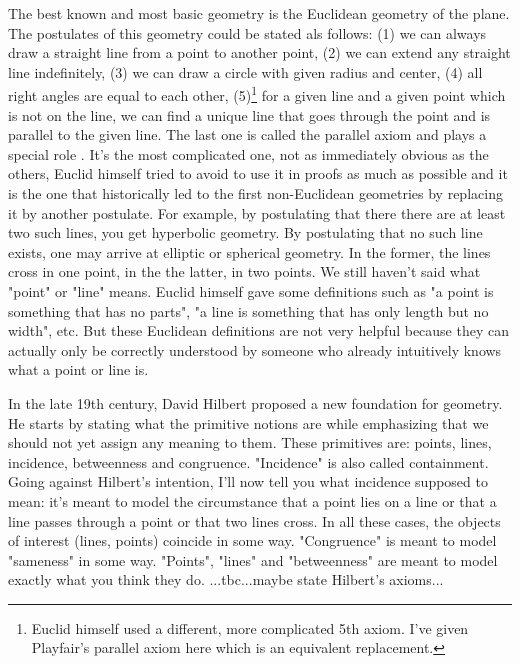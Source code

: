 \medskip
The best known and most basic geometry is the Euclidean geometry of the plane. The postulates of this geometry could be stated als follows: (1) we can always draw a straight line from a point to another point, (2) we can extend any straight line indefinitely, (3) we can draw a circle with given radius and center, (4) all right angles are equal to each other, (5)\footnote{Euclid himself used a different, more complicated 5th axiom. I've given Playfair's parallel axiom here which is an equivalent replacement.} for a given line and a given point which is not on the line, we can find a unique line that goes through the point and is parallel to the given line. The last one is called the parallel axiom and plays a special role . It's the most complicated one, not as immediately obvious as the others, Euclid himself tried to avoid to use it in proofs as much as possible and it is the one that historically led to the first non-Euclidean geometries by replacing it by another postulate. For example, by postulating that there  there are at least two such lines, you get hyperbolic geometry. By postulating that no such line exists, one may arrive at elliptic or spherical geometry. In the former, the lines cross in one point, in the the latter, in two points. We still haven't said what "point" or "line" means. Euclid himself gave some definitions such as "a point is something that has no parts", "a line is something that has only length but no width", etc. But these Euclidean definitions are not very helpful because they can actually only be correctly understood by someone who already intuitively knows what a point or line is.

\medskip
In the late 19th century, David Hilbert proposed a new foundation for geometry. He starts by stating what the primitive notions are while emphasizing that we should not yet assign any meaning to them. These primitives are: points, lines, incidence, betweenness and congruence. "Incidence" is also called containment. Going against Hilbert's intention, I'll now tell you what incidence supposed to mean: it's meant to model the circumstance that a point lies on a line or that a line passes through a point or that two lines cross. In all these cases, the objects of interest (lines, points) coincide in some way. "Congruence" is meant to model "sameness" in some way. "Points", "lines" and "betweenness" are meant to model exactly what you think they do. ...tbc...maybe state Hilbert's axioms...

